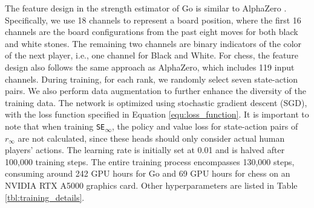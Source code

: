 The feature design in the strength estimator of Go is similar to AlphaZero \citep{silver_general_2018}.
Specifically, we use 18 channels to represent a board position, where the first 16 channels are the board configurations from the past eight moves for both black and white stones. 
The remaining two channels are binary indicators of the color of the next player, i.e., one channel for Black and White.
For chess, the feature design also follows the same approach as AlphaZero, which includes 119 input channels.
During training, for each rank, we randomly select seven state-action pairs. 
We also perform data augmentation to further enhance the diversity of the training data.
The network is optimized using stochastic gradient descent (SGD), with the loss function specified in Equation \ref{equ:loss_function}. 
It is important to note that when training \texttt{SE\textsubscript{$\infty$}}, the policy and value loss for state-action pairs of $r_\infty$ are not calculated, since these heads should only consider actual human players' actions.
The learning rate is initially set at 0.01 and is halved after 100,000 training steps. 
The entire training process encompasses 130,000 steps, consuming around 242 GPU hours for Go and 69 GPU hours for chess on an NVIDIA RTX A5000 graphics card. 
Other hyperparameters are listed in Table \ref{tbl:training_details}.

